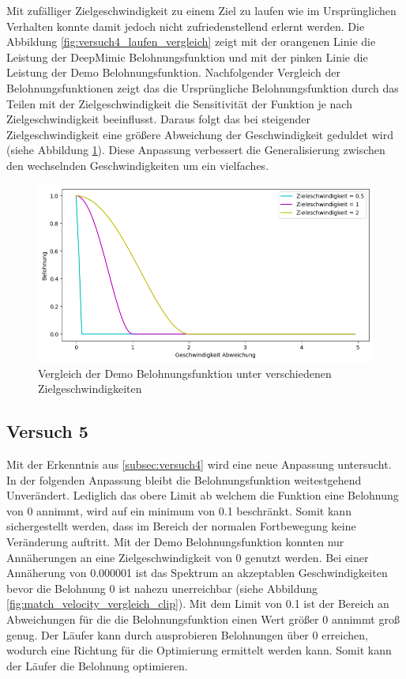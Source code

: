 Mit zufälliger Zielgeschwindigkeit zu einem Ziel zu laufen wie im Ursprünglichen Verhalten konnte damit jedoch nicht zufriedenstellend erlernt werden. Die Abbildung \ref{fig:versuch4_laufen_vergleich} zeigt mit der orangenen Linie die Leistung der DeepMimic Belohnungsfunktion und mit der pinken Linie die Leistung der Demo Belohnungsfunktion. Nachfolgender Vergleich der Belohnungsfunktionen zeigt das die Ursprüngliche Belohnungsfunktion durch das Teilen mit der Zielgeschwindigkeit die Sensitivität der Funktion je nach Zielgeschwindigkeit beeinflusst. Daraus folgt das bei steigender Zielgeschwindigkeit eine größere Abweichung der Geschwindigkeit geduldet wird (siehe Abbildung \ref{fig:match_velocity_demo_vergleich}). Diese Anpassung verbessert die Generalisierung zwischen den wechselnden Geschwindigkeiten um ein vielfaches.

\begin{figure}[H]
  \centering  
  \includegraphics[scale=0.5]{img/match_velocity_demo_vergleich.png}
  \caption{Vergleich der Demo Belohnungsfunktion unter verschiedenen Zielgeschwindigkeiten}
  \label{fig:match_velocity_demo_vergleich}
\end{figure}

\subsection{Versuch 5}
Mit der Erkenntnis aus \ref{subsec:versuch4} wird eine neue Anpassung untersucht. In der folgenden Anpassung bleibt die Belohnungsfunktion weitestgehend Unverändert. Lediglich das obere Limit ab welchem die Funktion eine Belohnung von 0 annimmt, wird auf ein minimum von 0.1 beschränkt. Somit kann sichergestellt werden, dass im Bereich der normalen Fortbewegung keine Veränderung auftritt. Mit der Demo Belohnungsfunktion konnten nur Annäherungen an eine Zielgeschwindigkeit von 0 genutzt werden. Bei einer Annäherung von 0.000001 ist das Spektrum an akzeptablen Geschwindigkeiten bevor die Belohnung 0 ist nahezu unerreichbar (siehe Abbildung \ref{fig:match_velocity_vergleich_clip}). Mit dem Limit von 0.1 ist der Bereich an Abweichungen für die die Belohnungsfunktion einen Wert größer 0 annimmt groß genug. Der Läufer kann durch ausprobieren Belohnungen über 0 erreichen, wodurch eine Richtung für die Optimierung ermittelt werden kann. Somit kann der Läufer die Belohnung optimieren.\\


